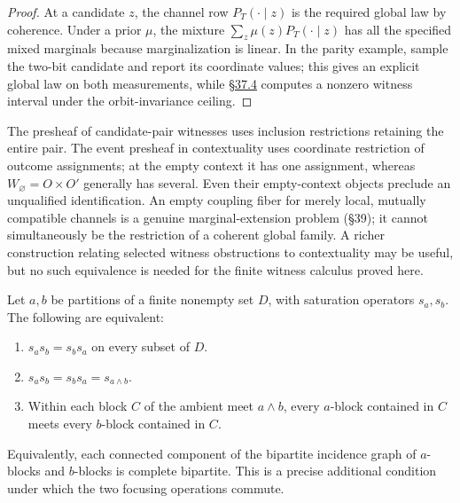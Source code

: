 \begin{proof}

At a candidate \(z\), the channel row \(P_T(\cdot\mid z)\) is the required global law by coherence. Under a prior \(\mu\), the mixture \(\sum_z\mu(z)P_T(\cdot\mid z)\) has all the specified mixed marginals because marginalization is linear. In the parity example, sample the two-bit candidate and report its coordinate values; this gives an explicit global law on both measurements, while \hyperlink{sec:37.4}{§37.4} computes a nonzero witness interval under the orbit-invariance ceiling.
\end{proof}

The presheaf of candidate-pair witnesses uses inclusion restrictions retaining the entire pair. The event presheaf in contextuality uses coordinate restriction of outcome assignments; at the empty context it has one assignment, whereas \(W_\varnothing=O\times O'\) generally has several. Even their empty-context objects preclude an unqualified identification. An empty coupling fiber for merely local, mutually compatible channels is a genuine marginal-extension problem (§39); it cannot simultaneously be the restriction of a coherent global family. A richer construction relating selected witness obstructions to contextuality may be useful, but no such equivalence is needed for the finite witness calculus proved here.


\begin{thmplain}

Let \(a,b\) be partitions of a finite nonempty set \(D\), with saturation operators \(s_a,s_b\). The following are equivalent:

\begin{enumerate}
\def\labelenumi{\arabic{enumi}.}
\tightlist
\item
  \(s_a s_b=s_b s_a\) on every subset of \(D\).
\item
  \(s_a s_b=s_b s_a=s_{a\wedge b}\).
\item
  Within each block \(C\) of the ambient meet \(a\wedge b\), every \(a\)-block contained in \(C\) meets every \(b\)-block contained in \(C\).
\end{enumerate}

Equivalently, each connected component of the bipartite incidence graph of \(a\)-blocks and \(b\)-blocks is complete bipartite. This is a precise additional condition under which the two focusing operations commute.
\end{thmplain}

